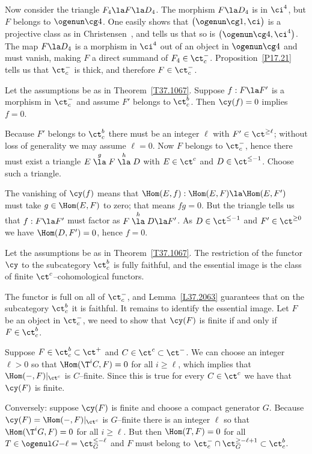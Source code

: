 \documentclass[11pt]{amsart}
\begin{document}
Now consider the triangle $F_4\la F\la D_4$.
The morphism $F\la D_4$ is in $\ci^4$, but $F$ belongs to $\ogenun\cg4$.
One easily shows that
$\big(\ogenun\cg1,\ci\big)$ is a projective
class as in Christensen~\cite[Definition~2.2]{Christensen96},
and \cite[Theorem~1.1]{Christensen96} tells us that
so is $\big(\ogenun\cg4,\ci^4\big)$.
The map $F\la D_4$ is a morphism in $\ci^4$ out
of an object in $\ogenun\cg4$ and must vanish, making $F$ a direct summand
of $F_4\in\ct^-_c$. Proposition~\ref{P17.21} tells us that $\ct^-_c$ is
thick, and therefore $F\in\ct^-_c$.
\eprf

Let the assumptions be as in
Theorem~\ref{T37.1067}. Suppose $f:F\la F'$ is a morphism
in $\ct^-_c$ and assume $F'$ belongs to $\ct^b_c$. Then
$\cy(f)=0$ implies $f=0$.
\elem

\prf
Because $F'$ belongs to $\ct^b_c$ there must be an integer $\ell$
with $F'\in\ct^{\geq\ell}$; without loss of generality we may assume
$\ell=0$. Now $F$ belongs to $\ct^-_c$, hence there must exist a triangle
$E\stackrel g\la F\stackrel h\la D$ with $E\in\ct^c$ and $D\in\ct^{\leq-1}$.
Choose
such a triangle.

The vanishing of $\cy(f)$ means that $\Hom(E,f):\Hom(E,F)\la\Hom(E,F')$
must take $g\in\Hom(E,F)$ to zero; that means $fg=0$. But
the triangle tells us that $f:F\la F'$ must factor as
$F\stackrel h\la D\la F'$. As $D\in\ct^{\leq-1}$ and $F'\in\ct^{\geq0}$ we
have $\Hom(D,F')=0$, hence $f=0$.
\eprf

Let the assumptions be as in
Theorem~\ref{T37.1067}. The restriction of the functor $\cy$ to
the subcategory $\ct^b_c$ is fully faithful, and the essential
image is the class of finite $\ct^c$--cohomological functors.
\ethm

\prf
The functor is full on all of $\ct^-_c$, and Lemma~\ref{L37.2063}
guarantees that on the subcategory $\ct^b_c$ it is faithful. It
remains to identify the essential image.
Let $F$ be an object in $\ct^-_c$, we need to show that
$\cy(F)$ is finite if and only if $F\in\ct^b_c$.

Suppose
$F\in\ct^b_c\subset\ct^+$ and
$C\in\ct^c\subset\ct^-$. We can choose an integer $\ell>0$ so that
$\Hom(\T^iC,F)=0$ for all $i\geq\ell$, which implies
that $\Hom(-,F)|_{\ct^c}$ is $C$--finite. Since this is true for every
$C\in\ct^c$ we have that $\cy(F)$ is finite.

Conversely: suppose $\cy(F)$ is finite and choose a
compact generator $G$. Because $\cy(F)=\Hom(-,F)|_{\ct^c}$
is $G$--finite there is an integer $\ell$ so that $\Hom(\T^iG,F)=0$
for all $i\geq\ell$. But then $\Hom(T,F)=0$ for
all $T\in\ogenul G{}{-\ell}=\ct_G^{\leq-\ell}$ and $F$ must belong to
$\ct^-_c\cap\ct_G^{\geq-\ell+1}\subset\ct^b_c$.
\eprf
\end{document}
